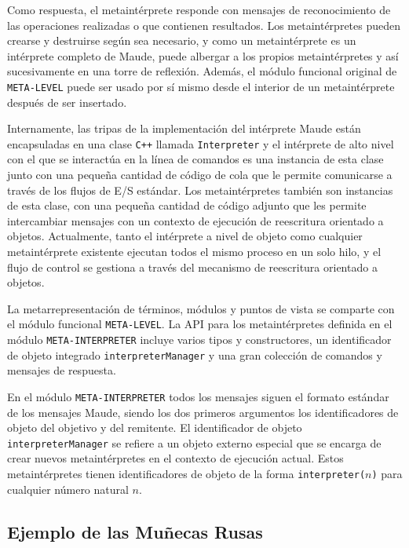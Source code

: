 Como respuesta, el metaintérprete responde con mensajes de reconocimiento de las operaciones realizadas o que contienen resultados. Los metaintérpretes pueden crearse y destruirse según sea necesario, y como un metaintérprete es un intérprete completo de Maude, puede albergar a los propios metaintérpretes y así sucesivamente en una torre de reflexión. Además, el módulo funcional original de \texttt{META-LEVEL} puede ser usado por sí mismo desde el interior de un metaintérprete después de ser insertado.

Internamente, las tripas de la implementación del intérprete Maude están encapsuladas en una clase \texttt{C++} llamada \texttt{Interpreter} y el intérprete de alto nivel con el que se interactúa en la línea de comandos es una instancia de esta clase junto con una pequeña cantidad de código de cola que le permite comunicarse a través de los flujos de E/S estándar. Los metaintérpretes también son instancias de esta clase, con una pequeña cantidad de código adjunto que les permite intercambiar mensajes con un contexto de ejecución de reescritura orientado a objetos. Actualmente, tanto el intérprete a nivel de objeto como cualquier metaintérprete existente ejecutan todos el mismo proceso en un solo hilo, y el flujo de control se gestiona a través del mecanismo de reescritura orientado a objetos.

La metarrepresentación de términos, módulos y puntos de vista se comparte con el módulo funcional \texttt{META-LEVEL}. La API para los metaintérpretes definida en el módulo \texttt{META-INTERPRETER} incluye varios tipos y constructores, un identificador de objeto integrado \texttt{interpreterManager} y una gran colección de comandos y mensajes de respuesta.

En el módulo \texttt{META-INTERPRETER} todos los mensajes siguen el formato estándar de los mensajes Maude, siendo los dos primeros argumentos los identificadores de objeto del objetivo y del remitente.
El identificador de objeto \texttt{interpreterManager} se refiere a un objeto externo especial que se encarga de crear nuevos metaintérpretes en el contexto de ejecución actual. Estos metaintérpretes tienen identificadores de objeto de la forma \texttt{interpreter(}$n$\texttt{)} para cualquier número natural $n$.



\subsection{Ejemplo de las Muñecas Rusas}

